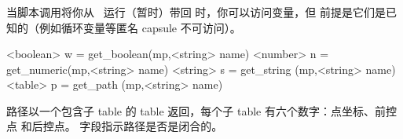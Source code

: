 \subsubsection{}


当脚本调用将你从 \METAPOST\ 运行（暂时）带回 \LUA 时，你可以访问变量，但
前提是它们是已知的（例如循环变量等匿名 capsule 不可访问）。

\begin{typing}
<boolean> w = get_boolean(mp,<string> name)
<number>  n = get_numeric(mp,<string> name)
<string>  s = get_string (mp,<string> name)
<table>   p = get_path   (mp,<string> name)
\end{typing}

路径以一个包含子 table 的 table 返回，每个子 table 有六个数字：点坐标、前控点
和后控点。 字段指示路径是否是闭合的。
